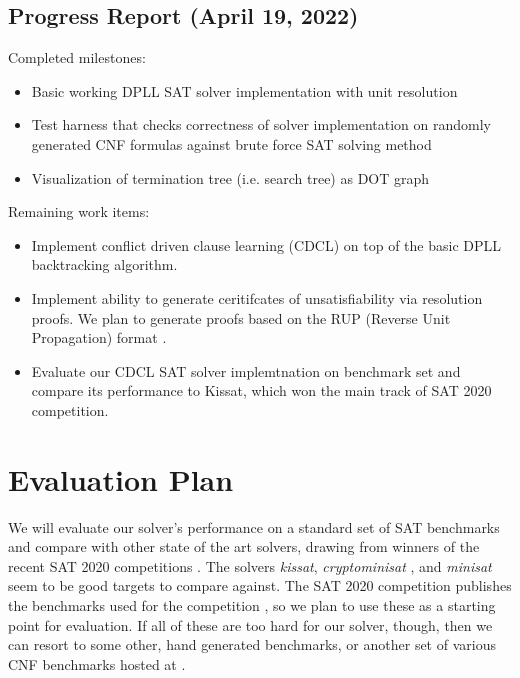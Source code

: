 \documentclass[12pt]{article}
\begin{document}
\subsection*{Progress Report (April 19, 2022)}

Completed milestones:

\begin{itemize}
    \item Basic working DPLL SAT solver implementation with unit resolution
    \item Test harness that checks correctness of solver implementation on randomly generated CNF formulas against brute force SAT solving method
    \item Visualization of termination tree (i.e. search tree) as DOT graph
\end{itemize}
Remaining work items:
\begin{itemize}
    \item Implement conflict driven clause learning (CDCL) on top of the basic DPLL backtracking algorithm.
    \item Implement ability to generate ceritifcates of unsatisfiability via resolution proofs. We plan to generate proofs based on the RUP (Reverse Unit Propagation) format \cite{goldberg03}.
    \item Evaluate our CDCL SAT solver implemtnation on benchmark set and compare its performance to Kissat, which won the main track of SAT 2020 competition.
\end{itemize}


\section{Evaluation Plan}
We will evaluate our solver's performance on a standard set of SAT benchmarks and compare with other state of the art solvers, drawing from winners of the recent SAT 2020 competitions \cite{2020satresults}. The solvers \textit{kissat}\cite{2020kissat}, \textit{cryptominisat} \cite{09cryptominisat}, and \textit{minisat}\cite{minisat} seem to be good targets to compare against. The SAT 2020 competition publishes the benchmarks used for the competition \cite{sat2020benchmarks}, so we plan to use these as a starting point for evaluation. If all of these are too hard for our solver, though, then we can resort to some other, hand generated benchmarks, or another set of various CNF benchmarks hosted at \cite{dimacsCNF}.



\end{document}
